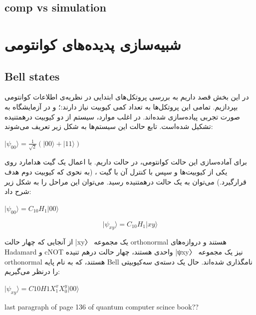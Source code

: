 \documentclass{book}
\begin{document}
\section{comp vs simulation}
	

\chapter{شبیه‌سازی پدیده‌های کوانتومی}
\section{Bell states}
در این بخش قصد داریم به بررسی پروتکل‌های ابتدایی در نظریه‌ی اطلاعات کوانتومی بپردازیم. تمامی این پروتکل‌ها به تعداد کمی کیوبیت نیاز دارند:؛ و در آزمایشگاه به صورت تجربی پیاده‌سازی شده‌اند. در اغلب موارد، سیستم از دو کیوبیت درهمتنیده تشکیل شده‌است. تابع حالت این سیستم‌ها به شکل زیر تعریف می‌شوند:
\begin{center}
	$\vert \psi_{00} \rangle = \frac{1}{\sqrt{2}}(|00\rangle + |11\rangle)$
\end{center}
برای آماده‌سازی این حالت کوانتومی‌، در حالت  داریم. با اعمال یک گیت هدامارد روی یکی از کیوبیت‌ها و سپس با کنترل‌ آن با گیت ، (به نحوی که کیوبیت دوم هدف قرارگیرد.) می‌توان به یک حالت درهمتنیده رسید. می‌توان این مراحل را به شکل زیر شرح داد:
\begin{center}
	$\vert\psi_{00}\rangle = C_{10}H_{1}\vert00\rangle$
\end{center}

\[
\vert\psi_{xy}\rangle = C_{10}H_{1}\vert xy \rangle
\]

از آنجایی که چهار حالت |xy〉 یک مجموعه orthonormal هستند و دروازه‌های Hadamard و cNOT واحدی هستند، چهار حالت درهم تنیده |ψxy〉 نیز یک مجموعه orthonormal هستند، که به نام پایه Bell نامگذاری شده‌اند. حال یک دسته‌ی سه‌کیوبیتی را درنظر ‌می‌گیریم:

\begin{center}
$\vert \psi_{xy}\rangle = C10H1X^{x}_{1} X^{y}_{0} \vert00\rangle$\\
\end{center}

last paragraph of page 136 of quantum computer scince book??\\
\end{document}
